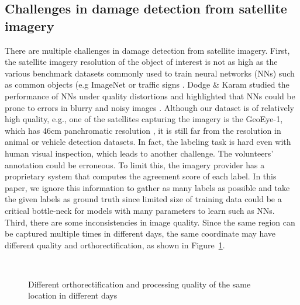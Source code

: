 \documentclass[journal, 12pt, onecolumn,draftclsnofoot]{IEEEtran}
\begin{document}
\subsection{Challenges in damage detection from satellite imagery}
There are multiple challenges in damage detection from satellite imagery. First, the satellite imagery resolution of the object of interest is not as high as the various benchmark datasets commonly used to train neural networks (NNs) such as common objects (e.g ImageNet \cite{cnn-imagenet} or traffic signs \cite{trafficSign}. Dodge \& Karam studied the performance of NNs under quality distortions and highlighted that NNs could be prone to errors in blurry and noisy images \cite{Dodge2016}. Although our dataset is of relatively high quality, e.g., one of the satellites capturing the imagery is the GeoEye-1, which has 46cm panchromatic resolution \cite{geoeye}, it is still far from the resolution in animal or vehicle detection datasets. In fact, the labeling task is hard even with human visual inspection, which leads to another challenge. The volunteers' annotation could be erroneous. To limit this, the imagery provider has a proprietary system that computes the agreement score of each label. In this paper, we ignore this information to gather as many labels as possible and take the given labels as ground truth since limited size of training data could be a critical bottle-neck for models with many parameters to learn such as NNs. Third, there are some inconsistencies in image quality. Since the same region can be captured multiple times in different days, the same coordinate may have different quality and orthorectification, as shown in Figure~\ref{fig:orthorectification}. 

\begin{figure}[h]{\centering
{}
\\
\caption{\small{Different orthorectification and processing quality  of the same location in different days}}
\label{fig:orthorectification}
}
\end{figure}
\end{document}
